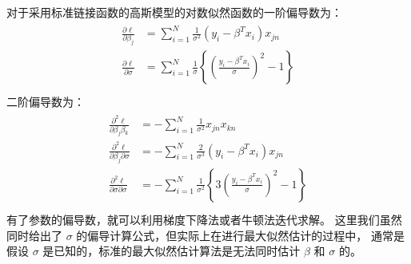 \documentclass[letterpaper,10pt,english]{sphinxmanual}
\begin{document}
对于采用标准链接函数的高斯模型的对数似然函数的一阶偏导数为：
\begin{align}\label{equation:高斯模型/content:高斯模型/content:11}\!\begin{aligned}
\frac{\partial \ell}{\partial \beta_j} &= \sum_{i=1}^N \frac{1}{\sigma^2}(y_i-\beta^T x_i)x_{jn}\\
\frac{\partial \ell}{\partial \sigma} &= \sum_{i=1}^N \frac{1}{\sigma}
 \left \{ \left ( \frac{y_i-\beta^T x_i}{\sigma} \right )^2 -1 \right \}\\
\end{aligned}\end{align}
二阶偏导数为：
\begin{align}\label{equation:高斯模型/content:高斯模型/content:12}\!\begin{aligned}
\frac{\partial^2 \ell}{\partial \beta_j\beta_k} &= - \sum_{i=1}^N \frac{1}{\sigma^2}x_{jn}x_{kn}\\
\frac{\partial^2 \ell}{\partial \beta_j \partial \sigma} &= -\sum_{i=1}^N \frac{2}{\sigma^3} (y_i-\beta^Tx_i) x_{jn}\\
\frac{\partial^2 \ell}{\partial \sigma \partial \sigma} &= -\sum_{i=1}^N
\frac{1}{\sigma^2} \left \{ 3\left ( \frac{y_i-\beta^T x_i}{\sigma} \right )^2 - 1\right \}\\
\end{aligned}\end{align}
有了参数的偏导数，就可以利用梯度下降法或者牛顿法迭代求解。
这里我们虽然同时给出了 \(\sigma\) 的偏导计算公式，但实际上在进行最大似然估计的过程中，
通常是假设 \(\sigma\) 是已知的，标准的最大似然估计算法是无法同时估计 \(\beta\) 和 \(\sigma\)
的。
\end{document}

